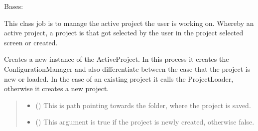 \documentclass[letterpaper,10pt,english]{sphinxmanual}
\begin{document}
\begin{fulllineitems}
\label{\detokenize{apidoc/src.osm_configurator.model.project:src.osm_configurator.model.project.active_project.ActiveProject}}
\pysigstartsignatures
{}
\pysigstopsignatures
\sphinxAtStartPar
Bases: 

\sphinxAtStartPar
This class job is to manage the active project the user is working on.
Whereby an active project, a project is that got selected by the user in the project selected screen or
created.

\begin{fulllineitems}
\label{\detokenize{apidoc/src.osm_configurator.model.project:src.osm_configurator.model.project.active_project.ActiveProject.__init__}}
\pysigstartsignatures
{}
\pysigstopsignatures
\sphinxAtStartPar
Creates a new instance of the ActiveProject. In this process it creates the ConfigurationManager and also
differentiate between the case that the project is new or loaded. In the case of an existing project it
calls the ProjectLoader, otherwise it creates a new project.
\begin{quote}\begin{description}
\begin{itemize}
\item {} 
\sphinxAtStartPar
{} () \textendash{} This is path pointing towards the folder, where the project is saved.

\item {} 
\sphinxAtStartPar
{} () \textendash{} This argument is true if the project is newly created, otherwise false.


\end{itemize}
\end{description}
\end{quote}
\end{fulllineitems}
\end{fulllineitems}
\end{document}
